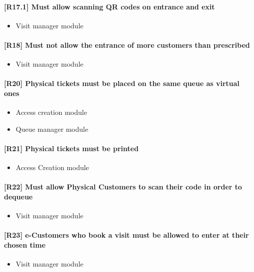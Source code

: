 \paragraph{[R17.1] Must allow scanning QR codes on entrance and exit}
\begin{itemize}[itemsep=-1mm, topsep=-1mm]
	\item Visit manager module
\end{itemize}

\paragraph{[R18] Must not allow the entrance of more customers than prescribed}
\begin{itemize}[itemsep=-1mm, topsep=-1mm]
	\item Visit manager module
\end{itemize}

\paragraph{[R20] Physical tickets must be placed on the same queue as virtual ones}
\begin{itemize}[itemsep=-1mm, topsep=-1mm]
	\item Access creation module
	\item Queue manager module
\end{itemize}

\paragraph{[R21] Physical tickets must be printed}
\begin{itemize}[itemsep=-1mm, topsep=-1mm]
	\item Access Creation module
\end{itemize}

\paragraph{[R22] Must allow Physical Customers to scan their code in order to dequeue}
\begin{itemize}[itemsep=-1mm, topsep=-1mm]
	\item Visit manager module
\end{itemize}

\paragraph{[R23] e-Customers who book a visit must be allowed to enter at their chosen time}
\begin{itemize}[itemsep=-1mm, topsep=-1mm]
	\item Visit manager module
\end{itemize}

